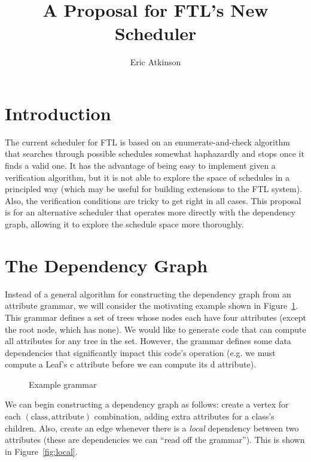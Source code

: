 \documentclass[10pt]{article}
\begin{document}
\title{A Proposal for FTL's New Scheduler}
\author{Eric Atkinson}
\maketitle

\section{Introduction}
The current scheduler for FTL is based on an enumerate-and-check algorithm that searches through possible schedules somewhat haphazardly and stops once it finds a valid one. It has the advantage of being easy to implement given a verification algorithm, but it is not able to explore the space of schedules in a principled way (which may be useful for building extensions to the FTL system). Also, the verification conditions are tricky to get right in all cases. This
proposal is for an alternative scheduler that operates more directly with the dependency graph, allowing it to explore the schedule space more thoroughly.

\section{The Dependency Graph}
Instead of a general algorithm for constructing the dependency graph from an attribute grammar, we will consider the motivating example shown in Figure~\ref{fig:grammar}. This grammar defines a set of trees whose nodes each have four attributes (except the root node, which has none). We would like to generate code that can compute all attributes for any tree in the set. However, the grammar defines some data dependencies that significantly impact this code's operation (e.g. we must
compute a Leaf's c attribute before we can compute its d attribute).

\begin{figure}[h]
    
    \caption{Example grammar}
    \label{fig:grammar}
\end{figure}

We can begin constructing a dependency graph as follows: create a vertex for each $ (\textrm{class},\textrm{attribute}) $ combination, adding extra attributes for a class's children. Also, create an edge whenever there is a \emph{local} dependency between two attributes (these are dependencies we can ``read off the grammar''). This is shown in Figure~\ref{fig:local}.
\end{document}
